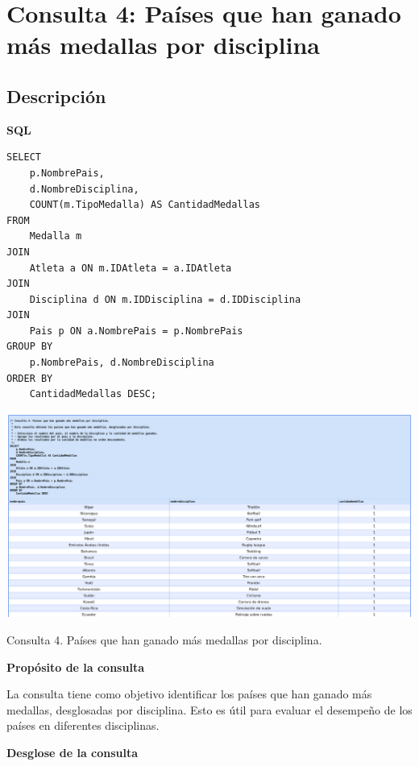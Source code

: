 \section*{Consulta 4: Países que han ganado más medallas por disciplina}

\subsection*{Descripción}

\textbf{SQL}

\begin{verbatim}
SELECT 
    p.NombrePais,
    d.NombreDisciplina,
    COUNT(m.TipoMedalla) AS CantidadMedallas
FROM 
    Medalla m
JOIN 
    Atleta a ON m.IDAtleta = a.IDAtleta
JOIN 
    Disciplina d ON m.IDDisciplina = d.IDDisciplina
JOIN 
    Pais p ON a.NombrePais = p.NombrePais
GROUP BY 
    p.NombrePais, d.NombreDisciplina
ORDER BY 
    CantidadMedallas DESC;
\end{verbatim}

\begin{center}
    \includegraphics[width=16.5cm]{../resources/Chapters/Consultas/Imagenes/Consulta4.jpeg} 
    
   Consulta 4. Países que han ganado más medallas por disciplina.
\end{center}

\textbf{Propósito de la consulta}

La consulta tiene como objetivo identificar los países que han ganado más medallas, desglosadas por disciplina. Esto es útil para evaluar el desempeño de los países en diferentes disciplinas.

\textbf{Desglose de la consulta}


